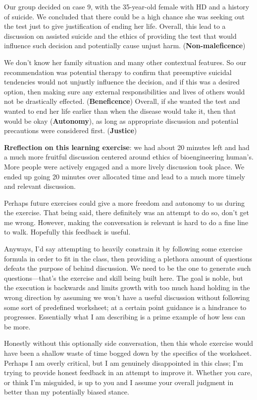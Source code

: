 \documentclass[plain,basic]{inVerba-notes}
\begin{document}
Our group decided on case 9, with the 35-year-old female with HD and a history of suicide. We concluded that there could be a high chance she was seeking out the test just to give justification of ending her life. Overall, this lead to a discussion on assisted suicide and the ethics of providing the test that would influence such decision and potentially cause unjust harm. (\textbf{Non-maleficence})

We don't know her family situation and many other contextual features. So our recommendation was potential therapy to confirm that preemptive suicidal tendencies would not unjustly influence the decision, and if this was a desired option, then making sure any external responsibilities and lives of others would not be drastically effected. (\textbf{Beneficence}) Overall, if she wanted the test and wanted to end her life earlier than when the disease would take it, then that would be okay (\textbf{Autonomy}), as long as appropriate discussion and potential precautions were considered first. (\textbf{Justice})

\textbf{Rreflection on this learning exercise}: we had about 20 minutes left and had a much more fruitful discussion centered around ethics of bioengineering human's. More people were actively engaged and a more lively discussion took place. We ended up going 20 minutes over allocated time and lead to a much more timely and relevant discussion. 

Perhaps future exercises could give a more freedom and autonomy to us during the exercise. That being said, there definitely was an attempt to do so, don't get me wrong. However, making the conversation is relevant is hard to do a fine line to walk. Hopefully this feedback is useful.

Anyways, I'd say attempting to heavily constrain it by following some exercise formula in order to fit in the class, then providing a plethora amount of questions defeats the purpose of behind discussion. We need to be the one to generate such questions---that's the exercise and skill being built here. The goal is noble, but the execution is backwards and limits growth with too much hand holding in the wrong direction by assuming we won't have a useful discussion without following some sort of predefined worksheet; at a certain point guidance is a hindrance to progresses. Essentially what I am describing is a prime example of how less can be more. 

Honestly without this optionally side conversation, then this whole exercise would have been a shallow waste of time bogged down by the specifics of the worksheet. Perhaps I am overly critical, but I am genuinely disappointed in this class; I'm trying to provide honest feedback in an attempt to improve it. Whether you care, or think I'm misguided, is up to you and I assume your overall judgment in better than my potentially biased stance. 
\end{document}
